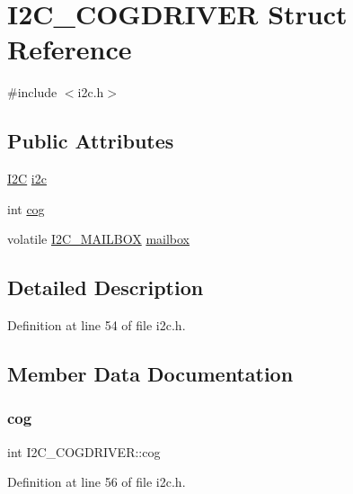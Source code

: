 \hypertarget{structI2C__COGDRIVER}{}\section{I2\+C\+\_\+\+C\+O\+G\+D\+R\+I\+V\+ER Struct Reference}
\label{structI2C__COGDRIVER}


{\ttfamily \#include $<$i2c.\+h$>$}

\subsection*{Public Attributes}
\begin{DoxyCompactItemize}
\item 
\mbox{\hyperlink{structI2C}{I2C}} \mbox{\hyperlink{structI2C__COGDRIVER_a34c037c8a81fa1a9ed148fb944271ff3}{i2c}}
\item 
int \mbox{\hyperlink{structI2C__COGDRIVER_aa381feac4bf88f23391e469e9d2a6bee}{cog}}
\item 
volatile \mbox{\hyperlink{structI2C__MAILBOX}{I2\+C\+\_\+\+M\+A\+I\+L\+B\+OX}} \mbox{\hyperlink{structI2C__COGDRIVER_a374bc1136f0881998dea2a4076e737d4}{mailbox}}
\end{DoxyCompactItemize}


\subsection{Detailed Description}


Definition at line 54 of file i2c.\+h.



\subsection{Member Data Documentation}
\mbox{\label{structI2C__COGDRIVER_aa381feac4bf88f23391e469e9d2a6bee}} 
\subsubsection{\texorpdfstring{cog}{cog}}
{\footnotesize\ttfamily int I2\+C\+\_\+\+C\+O\+G\+D\+R\+I\+V\+E\+R\+::cog}



Definition at line 56 of file i2c.\+h.

\mbox{\label{structI2C__COGDRIVER_a34c037c8a81fa1a9ed148fb944271ff3}} 
